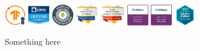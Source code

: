 \documentclass[a4paper,8pt]{article}
\begin{document}
\vspace{-1.0mm}
\par\medskip
\noindent\hspace*{-1cm}\colorbox{gray!8}{%
    \parbox{\paperwidth}{
        \begin{center}
            \includegraphics[width=0.071\textwidth,valign=t]{images/tensorflow.png}\hspace{0.01\textwidth}
            \includegraphics[width=0.071\textwidth,valign=t]{images/linux_sysadmin.png}\hspace{0.01\textwidth}
            \includegraphics[width=0.071\textwidth,valign=t]{images/android.png}\hspace{0.01\textwidth}
            \includegraphics[width=0.073\textwidth,valign=t]{images/cybersecurity.png}\hspace{0.01\textwidth}
            \includegraphics[width=0.082\textwidth,valign=t]{images/1.png}\hspace{0.01\textwidth}
            \includegraphics[width=0.071\textwidth,valign=t]{images/meta_backend.png}\hspace{0.01\textwidth}
            \includegraphics[width=0.071\textwidth,valign=t]{images/meta_frontend.png}\hspace{0.01\textwidth}
            \includegraphics[width=0.071\textwidth,valign=t]{images/aws.png}\hspace{0.01\textwidth}
        \end{center}
    }%
}\hspace*{-1cm}\par\medskip

\vspace{12cm}
Something here
\vspace{12cm}
\end{document}
